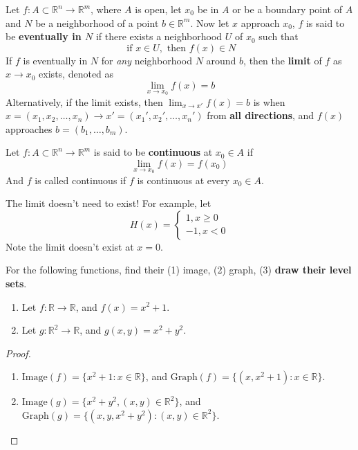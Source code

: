 \documentclass[openany]{book}
\newcommand{\R}{\mathbb{R}}
\begin{document}
\begin{defn}[limit]
    Let $f: A\subset\R^n\to\R^m$, where $A$ is open, let $x_0$ be in $A$ or be a boundary point of $A$ and $N$ be a neighborhood of a point $b\in\R^m$. Now let $x$ approach $x_0$, $f$ is said to be \textbf{eventually in $N$} if there exists a neighborhood $U$ of $x_0$ such that 
    \begin{equation*}
        \text{ if } x\in U, \text{ then } f(x)\in N
    \end{equation*}
    If $f$ is eventually in $N$ for \textit{any} neighborhood $N$ around $b$, then the \textbf{limit} of $f$ as $x\to x_0$ exists, denoted as 
    \begin{equation*}
        \lim_{x\to x_0}f(x)=b
    \end{equation*}
    Alternatively, if the limit exists, then $\lim_{x\to x'}f(x)=b$ is when $x=(x_1, x_2, \dots, x_n)\to x'=(x_1',x_2',\dots, x_n')$ from \textbf{all directions}, and $f(x)$ approaches $b=(b_1,\dots, b_m)$.
\end{defn}



\begin{defn}[continuity]
    Let $f:A\subset\R^n\to\R^m$ is said to be \textbf{continuous} at $x_0\in A$ if 
    \begin{equation*}
        \lim_{x\to x_0}f(x)=f(x_0)
    \end{equation*}
    And $f$ is called continuous if $f$ is continuous at every $x_0\in A$.
\end{defn}

\begin{example}
    The limit doesn't need to exist! For example, let 
    \begin{equation*}
        H(x)=\begin{cases}
            1, x\geq 0\\
            -1, x<0
        \end{cases}
    \end{equation*}
    Note the limit doesn't exist at $x=0$.
\end{example}




\begin{prob}
    For the following functions, find their (1) image, (2) graph, (3) \textbf{draw their level sets}.
    \begin{enumerate}
        \item  Let $f: \R\to\R$, and $f(x)=x^2+1$.
        \item Let $g: \R^2\to \R$, and $g(x,y)=x^2+y^2$.
    \end{enumerate}
\end{prob}
\begin{proof}
    \begin{enumerate}
        \item $\text{Image}(f)=\{x^2+1: x\in\R\}$, and $\text{Graph}(f)=\{(x,x^2+1):x\in\R\}$.
        \item $\text{Image}(g)=\{x^2+y^2, (x,y)\in\R^2\}$, and $\text{Graph}(g)=\{(x,y,x^2+y^2):(x,y)\in\R^2\}$.
    \end{enumerate}
\end{proof}
\end{document}
